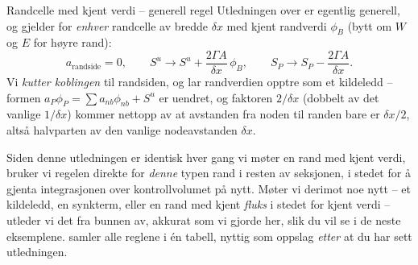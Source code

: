 \begin{oppsum}{Randcelle med kjent verdi -- generell regel}
Utledningen over er egentlig generell, og gjelder for \emph{enhver} randcelle av bredde $\delta x$ med kjent randverdi $\phi_B$ (bytt om $W$ og $E$ for høyre rand):
\[
a_{\text{randside}} = 0, \qquad S^u \to S^u + \frac{2\Gamma A}{\delta x}\,\phi_B, \qquad S_P \to S_P - \frac{2\Gamma A}{\delta x} .
\]
Vi \emph{kutter koblingen} til randsiden, og lar randverdien opptre som et kildeledd -- formen $a_P\phi_P=\sum a_{nb}\phi_{nb}+S^u$ er uendret, og faktoren $2/\delta x$ (dobbelt av det vanlige $1/\delta x$) kommer nettopp av at avstanden fra noden til randen bare er $\delta x/2$, altså halvparten av den vanlige nodeavstanden $\delta x$.

Siden denne utledningen er identisk hver gang vi møter en rand med kjent verdi, bruker vi regelen direkte for \emph{denne} typen rand i resten av seksjonen, i stedet for å gjenta integrasjonen over kontrollvolumet på nytt. Møter vi derimot noe nytt -- et kildeledd, en synkterm, eller en rand med kjent \emph{fluks} i stedet for kjent verdi -- utleder vi det fra bunnen av, akkurat som vi gjorde her, slik du vil se i de neste eksemplene.  samler alle reglene i én tabell, nyttig som oppslag \emph{etter} at du har sett utledningen.
\end{oppsum}

